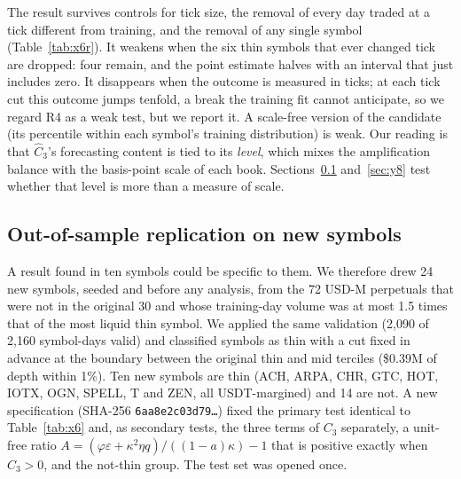 The result survives controls for tick size, the removal of every day traded at a tick different from training, and the removal of any single symbol (Table~\ref{tab:x6r}). It weakens when the six thin symbols that ever changed tick are dropped: four remain, and the point estimate halves with an interval that just includes zero. It disappears when the outcome is measured in ticks; at each tick cut this outcome jumps tenfold, a break the training fit cannot anticipate, so we regard R4 as a weak test, but we report it. A scale-free version of the candidate (its percentile within each symbol's training distribution) is weak. Our reading is that $\hat C_3$'s forecasting content is tied to its \emph{level}, which mixes the amplification balance with the basis-point scale of each book. Sections~\ref{sec:y6} and~\ref{sec:y8} test whether that level is more than a measure of scale.

\subsection{Out-of-sample replication on new symbols}\label{sec:y6}
A result found in ten symbols could be specific to them. We therefore drew 24 new symbols, seeded and before any analysis, from the 72 USD-M perpetuals that were not in the original 30 and whose training-day volume was at most 1.5 times that of the most liquid thin symbol. We applied the same validation (2{,}090 of 2{,}160 symbol-days valid) and classified symbols as thin with a cut fixed in advance at the boundary between the original thin and mid terciles (\$0.39M of depth within 1\%). Ten new symbols are thin (ACH, ARPA, CHR, GTC, HOT, IOTX, OGN, SPELL, T and ZEN, all USDT-margined) and 14 are not. A new specification (SHA-256 \texttt{6aa8e2c03d79\ldots}) fixed the primary test identical to Table~\ref{tab:x6} and, as secondary tests, the three terms of $C_3$ separately, a unit-free ratio $A=(\varphi\varepsilon+\kappa^2\eta q)/((1-a)\kappa)-1$ that is positive exactly when $C_3>0$, and the not-thin group. The test set was opened once.


